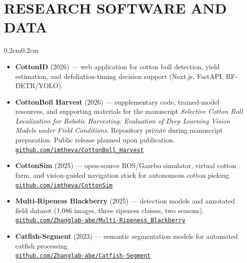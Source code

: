 \documentclass[10pt, letterpaper]{article}
\newcommand{\repo}[1]{\href{https://#1}{\texttt{#1}}}
\newenvironment{highlights}{%
    \begin{itemize}[topsep=0.08cm, parsep=0.08cm, partopsep=0pt,
                    itemsep=0pt, leftmargin=0.4cm + 10pt]
}{\end{itemize}}
\newenvironment{onecolentry}{%
    \begin{adjustwidth}{0.2cm}{0.2cm}
}{\end{adjustwidth}}
\begin{document}
\section{RESEARCH SOFTWARE AND DATA}
\vspace{0.08cm}
\begin{onecolentry}
    \begin{highlights}
        \item \textbf{CottonID} (2026) --- web application for cotton boll detection,
              yield estimation, and defoliation-timing decision support
              (Next.js, FastAPI, RF-DETR/YOLO).
        \item \textbf{CottonBoll Harvest} (2026) --- supplementary code, trained-model
              resources, and supporting materials for the manuscript
              \emph{Selective Cotton Boll Localization for Robotic Harvesting:
              Evaluation of Deep Learning Vision Models under Field Conditions}.
              Repository private during manuscript preparation. Public release planned upon publication.
              \\ \repo{github.com/imtheva/CottonBoll\_Harvest}
        \item \textbf{CottonSim} (2025) --- open-source ROS/Gazebo simulator, virtual
              cotton farm, and vision-guided navigation stack for autonomous cotton
              picking. \\ \repo{github.com/imtheva/CottonSim}
        \item \textbf{Multi-Ripeness Blackberry} (2025) --- detection models and
              annotated field dataset (1{,}086 images, three ripeness classes, two
              seasons). \\ \repo{github.com/Zhanglab-abe/Multi-Ripeness\_Blackberry}
        \item \textbf{Catfish-Segment} (2023) --- semantic segmentation models for
              automated catfish processing.
              \\ \repo{github.com/Zhanglab-abe/Catfish-Segment}
    \end{highlights}
\end{onecolentry}
\vspace{0.18cm}

\end{document}
